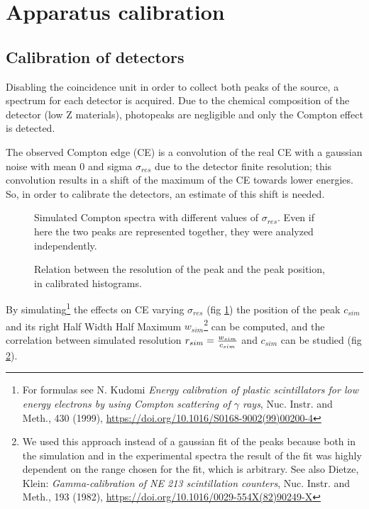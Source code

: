 \documentclass[11pt,a4 paper]{article}
\let\oldfrac\frac
\renewcommand{\frac}[3][d]{\ifthenelse{\equal{#1}{d}}{\oldfrac{#2}{#3}}{\nicefrac{#2}{#3}}}
\begin{document}
\section{Apparatus calibration}

\subsection{Calibration of detectors}
Disabling the coincidence unit in order to collect both peaks of the  source, a spectrum for each detector is acquired. Due to the chemical composition of the detector (low Z materials), photopeaks are negligible and only the Compton effect is detected.

The observed Compton edge (CE) is a convolution of the real CE with a gaussian noise with mean $0$ and sigma $\sigma_{res}$ due to the detector finite resolution; this convolution results in a shift of the maximum of the CE towards lower energies. So, in order to calibrate the detectors, an estimate of this shift is needed.

\begin{figure}[H]
    \centering
    \caption{Simulated Compton spectra with different values of $\sigma_{res}$. Even if here the two peaks are represented together, they were analyzed independently.}
    \label{fig:sim:spectra}
\end{figure}

\begin{figure}[H]
    \centering
    \caption{Relation between the resolution of the peak and the peak position, in calibrated histograms.}
    \label{fig:sim}
\end{figure}

By simulating\footnote{For formulas see N. Kudomi \emph{Energy calibration of plastic scintillators for low energy electrons by using Compton scattering of $\gamma$ rays}, Nuc. Instr. and Meth., 430 (1999), \url{https://doi.org/10.1016/S0168-9002(99)00200-4}} the effects on CE varying $\sigma_{res}$ (fig \ref{fig:sim:spectra}) the position of the peak $c_{sim}$ and its right Half Width Half Maximum $w_{sim}$\footnote{We used this approach instead of a gaussian fit of the peaks because both in the simulation and in the experimental spectra the result of the fit was highly dependent on the range chosen for the fit, which is arbitrary. See also Dietze, Klein: \emph{Gamma-calibration of NE 213 scintillation counters}, Nuc. Instr. and Meth., 193 (1982), \url{https://doi.org/10.1016/0029-554X(82)90249-X}} can be computed, and the correlation between simulated resolution $r_{sim} = \frac{w_{sim}}{c_{sim}}$ and $c_{sim}$ can be studied (fig \ref{fig:sim}).
\end{document}

